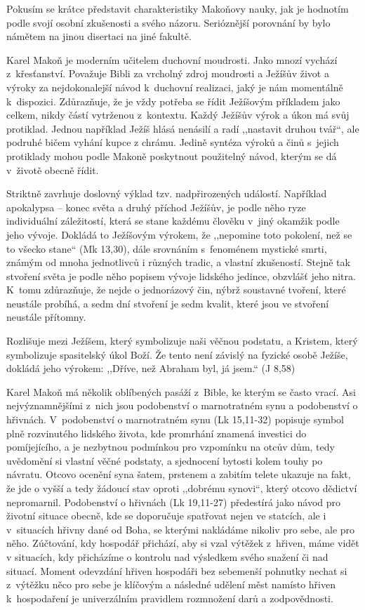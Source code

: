 Pokusím se krátce představit charakteristiky Makoňovy nauky,
jak je hodnotím podle svojí osobní zkušenosti a svého
názoru. Serióznější porovnání by bylo námětem na jinou disertaci na jiné
fakultě.

Karel Makoň je moderním učitelem duchovní moudrosti. Jako mnozí vychází z~křesťanství. Považuje Bibli za vrcholný zdroj
moudrosti a Ježíšův život a výroky za nejdokonalejší návod k~duchovní realizaci,
jaký je nám momentálně k~dispozici. Zdůrazňuje, že je vždy potřeba se řídit
Ježíšovým příkladem jako celkem, nikdy částí vytrženou z~kontextu. Každý Ježíšův
výrok a úkon má svůj protiklad. Jednou například Ježíš hlásá nenásilí a radí
,,nastavit druhou tvář``, ale podruhé bičem vyhání kupce z chrámu. Jedině syntéza výroků a činů s~jejich protiklady
mohou podle Makoně poskytnout použitelný návod, kterým se dá v~životě obecně
řídit.

Striktně zavrhuje doslovný výklad tzv. nadpřirozených událostí. Například
apokalypsa -- konec světa a druhý příchod Ježíšův, je podle něho ryze individuální záležitostí, která se
stane každému člověku v~jiný okamžik podle jeho vývoje. Dokládá to Ježíšovým
výrokem, že ,,nepomine toto pokolení, než se to všecko stane`` (Mk 13,30), dále
srovnáním s~fenoménem mystické smrti, známým od mnoha jednotlivců i různých
tradic, a vlastní zkušeností. Stejně tak stvoření světa je podle něho popisem
vývoje lidského jedince, obzvlášť jeho nitra. K~tomu zdůrazňuje, že nejde o
jednorázový čin, nýbrž soustavné tvoření, které neustále probíhá, a
sedm dní stvoření je sedm kvalit, které jsou ve stvoření neustále přítomny.

Rozlišuje mezi Ježíšem, který symbolizuje naši věčnou podstatu, a Kristem, který
symbolizuje spasitelský úkol Boží. Že tento není závislý na fyzické osobě Ježíše,
dokládá jeho výrokem: ,,Dříve, než Abraham byl, já jsem.`` (J 8,58)

Karel Makoň má několik oblíbených pasáží z~Bible, ke kterým se často vrací. Asi
nejvýznamnějšími z~nich jsou podobenství o marnotratném synu a podobenství o
hřivnách. V~podobenství o marnotratném synu (Lk 15,11-32) popisuje symbol plně rozvinutého
lidského života, kde promrhání znamená investici do pomíjejícího, a je nezbytnou
podmínkou pro vzpomínku na otcův dům, tedy uvědomění si vlastní věčné podstaty, a
sjednocení bytosti kolem touhy po návratu. Otcovo ocenění syna šatem, prstenem a
zabitím telete ukazuje na fakt, že jde o vyšší a tedy žádoucí stav oproti
,,dobrému synovi``, který otcovo dědictví nepromarnil. Podobenství o hřivnách (Lk 19,11-27)
předestírá jako návod pro životní situace obecně, kde se doporučuje spatřovat
nejen ve statcích, ale i v~situacích hřivny dané od Boha, se kterými nakládáme
nikoliv pro sebe, ale pro něho. Zúčtování, kdy hospodář přichází, aby si vzal
výtěžek z~hřiven, máme vidět v situacích, kdy přicházíme o kontrolu nad
výsledkem svého snažení či nad situací. Moment odevzdání hřiven hospodáři bez
sebemenší pohnutky nechat si z~výtěžku něco pro sebe je klíčovým a následné udělení měst
namísto hřiven k~hospodaření je univerzálním pravidlem rozmnožení darů a
zodpovědnosti.

